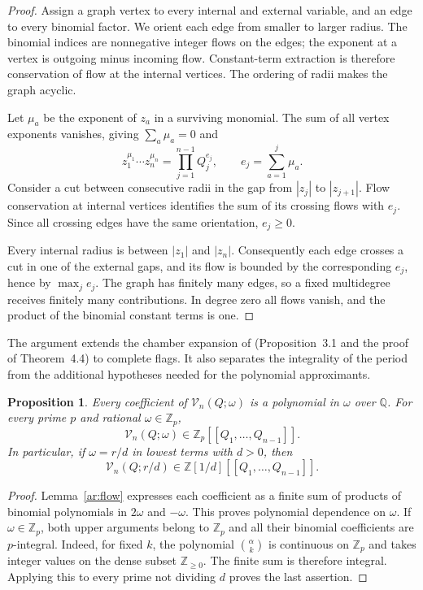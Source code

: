 \documentclass[11pt]{amsart}
\newtheorem{proposition}[theorem]{Proposition}
\theoremstyle{definition}
\theoremstyle{remark}
\numberwithin{equation}{section}
\newcommand{\Z}{\mathbb Z}
\newcommand{\Q}{\mathbb Q}
\begin{document}
\begin{proof}
Assign a graph vertex to every internal and external variable,
and an edge to every binomial factor. We orient each edge from smaller to larger radius.
The binomial indices are nonnegative integer flows on the edges;
the exponent at a vertex is outgoing minus incoming flow.
Constant-term extraction is therefore conservation of flow at
the internal vertices. The ordering of radii makes the graph
acyclic.

Let $\mu_a$ be the exponent of $z_a$ in a surviving monomial.
The sum of all vertex exponents vanishes, giving $\sum_a\mu_a=0$
and
\[
 z_1^{\mu_1}\cdots z_n^{\mu_n}
 =\prod_{j=1}^{n-1}Q_j^{e_j},
 \qquad e_j=\sum_{a=1}^j\mu_a.
\]
Consider a cut between consecutive radii in the gap from $|z_j|$
to $|z_{j+1}|$. Flow conservation at internal vertices identifies
the sum of its crossing flows with $e_j$. Since all crossing edges
have the same orientation, $e_j\geq0$.

Every internal radius is between $|z_1|$ and $|z_n|$.
Consequently each edge crosses a cut in one of the external gaps,
and its flow is bounded by the corresponding $e_j$, hence by
$\max_j e_j$. The graph has finitely many edges, so a fixed
multidegree receives finitely many contributions. In degree zero
all flows vanish, and the product of the binomial constant terms
is one.
\end{proof}

The argument extends the chamber expansion of \cite{SV23}
(Proposition~3.1 and the proof of Theorem~4.4) to complete flags.
It also separates the integrality of the period from the
additional hypotheses needed for the polynomial approximants.

\begin{proposition}\label{ar:general-integrality}
Every coefficient of $\mathcal V_n(Q;\omega)$ is a polynomial
in $\omega$ over $\Q$. For every prime $p$ and rational
$\omega\in\Z_p$,
\[
 \mathcal V_n(Q;\omega)\in\Z_p[[Q_1,\ldots,Q_{n-1}]].
\]
In particular, if $\omega=r/d$ in lowest terms with $d>0$, then
\[
 \mathcal V_n(Q;r/d)\in\Z[1/d][[Q_1,\ldots,Q_{n-1}]].
\]
\end{proposition}

\begin{proof}
Lemma~\ref{ar:flow} expresses each coefficient as a finite sum
of products of binomial polynomials in $2\omega$ and $-\omega$.
This proves polynomial dependence on $\omega$. If
$\omega\in\Z_p$, both upper arguments belong to $\Z_p$ and
all their binomial coefficients are $p$-integral. Indeed, for
fixed $k$, the polynomial $\binom{\alpha}{k}$ is continuous on
$\Z_p$ and takes integer values on the dense subset
$\Z_{\geq0}$. The finite sum is therefore integral. Applying
this to every prime not dividing $d$ proves the last assertion.
\end{proof}
\end{document}
